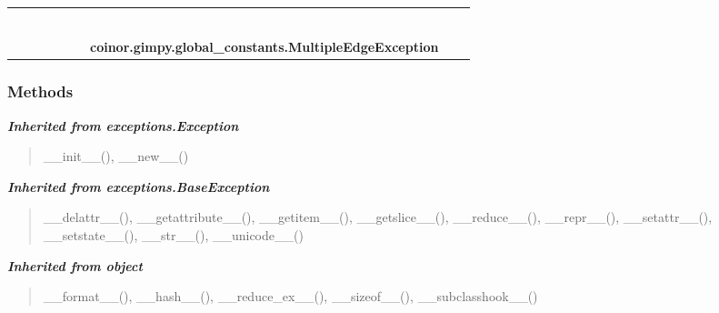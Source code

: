     \label{coinor:gimpy:global_constants:MultipleEdgeException}
\begin{tabular}{cccccccccc}
\multicolumn{2}{r}{\settowidth{\BCL}{object}\multirow{2}{\BCL}{object}}
&&
&&
&&
  \\\cline{3-3}
  &&\multicolumn{1}{c|}{}
&&
&&
&&
  \\
\multicolumn{4}{r}{\settowidth{\BCL}{exceptions.BaseException}\multirow{2}{\BCL}{exceptions.BaseException}}
&&
&&
  \\\cline{5-5}
  &&&&\multicolumn{1}{c|}{}
&&
&&
  \\
\multicolumn{6}{r}{\settowidth{\BCL}{exceptions.Exception}\multirow{2}{\BCL}{exceptions.Exception}}
&&
  \\\cline{7-7}
  &&&&&&\multicolumn{1}{c|}{}
&&
  \\
&&&&&&\multicolumn{2}{l}{\textbf{coinor.gimpy.global\_constants.MultipleEdgeException}}
\end{tabular}



  \subsubsection{Methods}


\large{\textbf{\textit{Inherited from exceptions.Exception}}}

\begin{quote}
\_\_init\_\_(), \_\_new\_\_()
\end{quote}

\large{\textbf{\textit{Inherited from exceptions.BaseException}}}

\begin{quote}
\_\_delattr\_\_(), \_\_getattribute\_\_(), \_\_getitem\_\_(), \_\_getslice\_\_(), \_\_reduce\_\_(), \_\_repr\_\_(), \_\_setattr\_\_(), \_\_setstate\_\_(), \_\_str\_\_(), \_\_unicode\_\_()
\end{quote}

\large{\textbf{\textit{Inherited from object}}}

\begin{quote}
\_\_format\_\_(), \_\_hash\_\_(), \_\_reduce\_ex\_\_(), \_\_sizeof\_\_(), \_\_subclasshook\_\_()
\end{quote}

